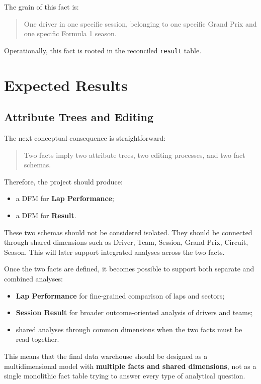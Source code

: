 \documentclass[a4paper,11pt]{article}
\begin{document}
	The grain of this fact is:
	\begin{quote}
		One driver in one specific session, belonging to one specific Grand Prix and one specific Formula 1 season.
	\end{quote}
	
	Operationally, this fact is rooted in the reconciled \texttt{result} table.
	
	\section{Expected Results}
	
	\subsection{Attribute Trees and Editing}
	
	The next conceptual consequence is straightforward:
	\begin{quote}
		Two facts imply two attribute trees, two editing processes, and two fact schemas.
	\end{quote}
	
	Therefore, the project should produce:
	\begin{itemize}[leftmargin=1.5em]
		\item a DFM for \textbf{Lap Performance};
		\item a DFM for \textbf{Result}.
	\end{itemize}
	
	These two schemas should not be considered isolated. They should be connected through shared dimensions such as Driver, Team, Session, Grand Prix, Circuit, Season. This will later support integrated analyses across the two facts.
	

	Once the two facts are defined, it becomes possible to support both separate and combined analyses:
	\begin{itemize}[leftmargin=1.5em]
		\item \textbf{Lap Performance} for fine-grained comparison of laps and sectors;
		\item \textbf{Session Result} for broader outcome-oriented analysis of drivers and teams;
		\item shared analyses through common dimensions when the two facts must be read together.
	\end{itemize}
	
	This means that the final data warehouse should be designed as a multidimensional model with \textbf{multiple facts and shared dimensions}, not as a single monolithic fact table trying to answer every type of analytical question.
	
\end{document}
